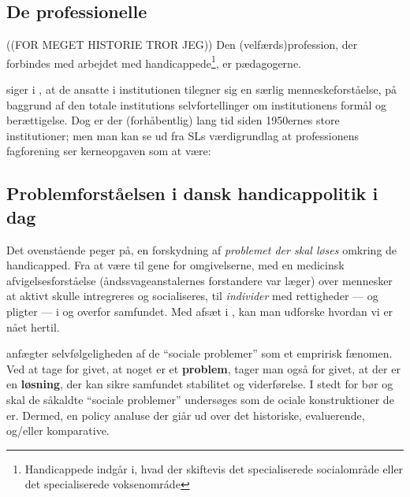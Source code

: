 \subsection{De professionelle}
((FOR MEGET HISTORIE TROR JEG))
Den (velfærds)profession, der forbindes med arbejdet med handicappede\footnote{Handicappede indgår i, hvad der skiftevis det specialiserede socialområde eller det specialiserede voksenomráde}, er pædagogerne.

\citeauthor{goffmanAsylumsEssaysSocial1991} siger i , at de ansatte  i institutionen tilegner sig en særlig menneskeforståelse, på baggrund af den totale institutions selvfortellinger om institutionens formål og berættigelse.
Dog er der (forhåbentlig) lang tid siden 1950ernes store institutioner; men man kan se ud fra SLs værdigrundlag at professionens fagforening ser kerneopgaven som at være:

\subsection{Problemforståelsen i dansk handicappolitik i dag}
Det ovenstående peger på, en forskydning af \textit{problemet der skal løses} omkring de handicapped.
Fra at være til gene for omgivelserne, med en medicinsk afvigelsesforståelse (åndssvageanstalernes forstandere var læger) over mennesker at aktivt skulle intregreres og socialiseres, til \textit{individer} med rettigheder — og pligter — i og overfor samfundet.
Med afsæt i \citeauthor{scheurichPolicyArchaeologyNew1994}, kan man udforske hvordan vi er nået hertil.

\citeauthor{scheurig} anfægter selvfølgeligheden af de “sociale problemer” som et empririsk fænomen.
Ved at tage for givet, at noget er et \textbf{problem}, tager man også for givet, at der er en \textbf{løsning}, der kan sikre samfundet stabilitet og viderførelse.
I stedt for bør og skal de såkaldte “sociale problemer” undersøges som de ociale konstruktioner de er.
Dermed, en policy analuse der giår ud over det historiske, evaluerende, og/eller komparative.


